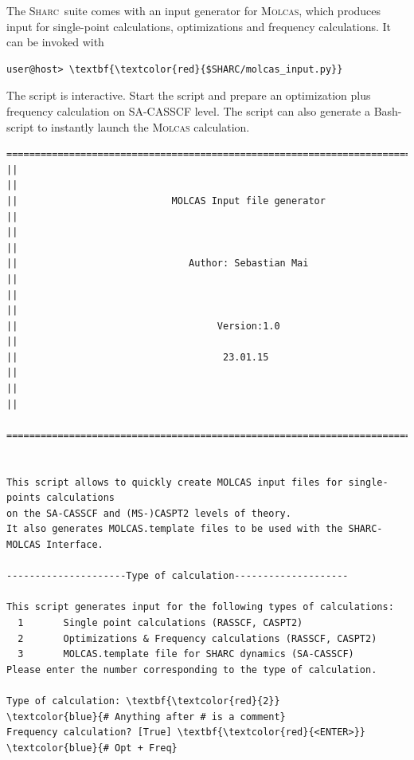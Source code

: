 \documentclass[a4paper,11pt,DIV=15,openany]{scrbook}
\newcommand{\sharc}{\textsc{Sharc}}
\begin{document}
The \sharc\ suite comes with an input generator for \textsc{Molcas}, which produces input for single-point calculations, optimizations and frequency calculations. 
It can be invoked with
\begin{Verbatim}[commandchars=\\\{\}]
user@host> \textbf{\textcolor{red}{$SHARC/molcas_input.py}}
\end{Verbatim}
The script is interactive. 
Start the script and prepare an optimization plus frequency calculation on SA-CASSCF level. 
The script can also generate a Bash-script to instantly launch the \textsc{Molcas} calculation.

\begin{oframed}
\footnotesize\begin{Verbatim}[commandchars=\\\{\}]
  ================================================================================
||                                                                                ||
||                           MOLCAS Input file generator                          ||
||                                                                                ||
||                              Author: Sebastian Mai                             ||
||                                                                                ||
||                                   Version:1.0                                  ||
||                                    23.01.15                                    ||
||                                                                                ||
  ================================================================================


This script allows to quickly create MOLCAS input files for single-points calculations
on the SA-CASSCF and (MS-)CASPT2 levels of theory. 
It also generates MOLCAS.template files to be used with the SHARC-MOLCAS Interface.
  
---------------------Type of calculation--------------------

This script generates input for the following types of calculations:
  1       Single point calculations (RASSCF, CASPT2)
  2       Optimizations & Frequency calculations (RASSCF, CASPT2)
  3       MOLCAS.template file for SHARC dynamics (SA-CASSCF)
Please enter the number corresponding to the type of calculation.

Type of calculation: \textbf{\textcolor{red}{2}}                       \textcolor{blue}{# Anything after # is a comment}
Frequency calculation? [True] \textbf{\textcolor{red}{<ENTER>}}        \textcolor{blue}{# Opt + Freq}


\end{Verbatim}
\end{oframed}
\end{document}
